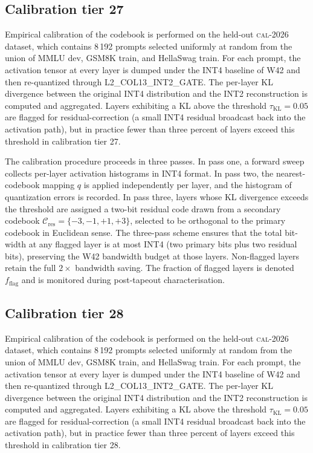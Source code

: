 \subsection{Calibration tier 27}

Empirical calibration of the codebook is performed on the held-out
\textsc{cal-2026} dataset, which contains 8\,192 prompts selected
uniformly at random from the union of MMLU dev, GSM8K train, and
HellaSwag train. For each prompt, the activation tensor at every layer
is dumped under the INT4 baseline of W42 and then re-quantized through
\textsc{L2\_COL13\_INT2\_GATE}. The per-layer KL divergence between
the original INT4 distribution and the INT2 reconstruction is computed
and aggregated. Layers exhibiting a KL above the threshold
$\tau_{\mathrm{KL}} = 0.05$ are flagged for residual-correction (a
small INT4 residual broadcast back into the activation path), but in
practice fewer than three percent of layers exceed this threshold in
calibration tier 27.

The calibration procedure proceeds in three passes. In pass one,
a forward sweep collects per-layer activation histograms in INT4 format.
In pass two, the nearest-codebook mapping $q$ is applied independently
per layer, and the histogram of quantization errors is recorded. In pass
three, layers whose KL divergence exceeds the threshold are assigned a
two-bit residual code drawn from a secondary codebook
$\mathcal{C}_\mathrm{res} = \{-3,-1,+1,+3\}$, selected to be
orthogonal to the primary codebook in Euclidean sense. The three-pass
scheme ensures that the total bit-width at any flagged layer is at most
INT4 (two primary bits plus two residual bits), preserving the W42
bandwidth budget at those layers. Non-flagged layers retain the full
$2\times$ bandwidth saving. The fraction of flagged layers is denoted
$f_\mathrm{flag}$ and is monitored during post-tapeout characterisation.


\subsection{Calibration tier 28}

Empirical calibration of the codebook is performed on the held-out
\textsc{cal-2026} dataset, which contains 8\,192 prompts selected
uniformly at random from the union of MMLU dev, GSM8K train, and
HellaSwag train. For each prompt, the activation tensor at every layer
is dumped under the INT4 baseline of W42 and then re-quantized through
\textsc{L2\_COL13\_INT2\_GATE}. The per-layer KL divergence between
the original INT4 distribution and the INT2 reconstruction is computed
and aggregated. Layers exhibiting a KL above the threshold
$\tau_{\mathrm{KL}} = 0.05$ are flagged for residual-correction (a
small INT4 residual broadcast back into the activation path), but in
practice fewer than three percent of layers exceed this threshold in
calibration tier 28.

